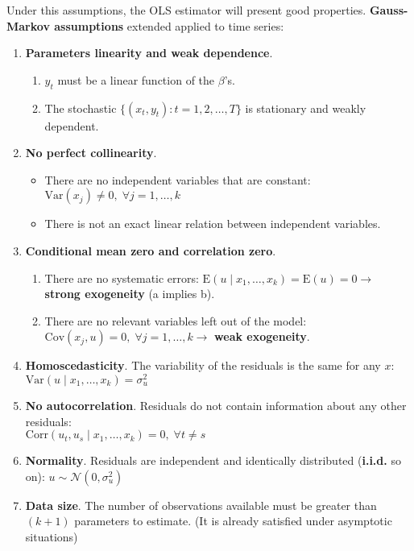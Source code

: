 \documentclass[10pt, a4paper, landscape]{article}
\newcommand{\E}{\mathrm{E}}
\newcommand{\Var}{\mathrm{Var}}
\newcommand{\Cov}{\mathrm{Cov}}
\newcommand{\Corr}{\mathrm{Corr}}
\begin{document}
\begin{multicols}{3}
		Under this assumptions, the OLS estimator will present good properties. \textbf{Gauss-Markov assumptions} extended applied to time series:
		
		\begin{enumerate}[leftmargin=*, label=t\arabic{*}.]
			\item \textbf{Parameters linearity and weak dependence}.
			
			\begin{enumerate}[leftmargin=*, label=\alph{*}.]
				\item $y_{t}$ must be a linear function of the $\beta$'s.
				\item The stochastic $\lbrace( x_{t}, y_{t}) : t = 1, 2, \ldots, T \rbrace$ is stationary and weakly dependent.
			\end{enumerate}
			
			\item \textbf{No perfect collinearity}.
			
			\begin{itemize}[leftmargin=*]
				\item There are no independent variables that are constant: $\Var(x_{j}) \neq 0, \; \forall j = 1, \ldots, k$
				\item There is not an exact linear relation between independent variables.
			\end{itemize}
			
			\item \textbf{Conditional mean zero and correlation zero}.
			
			\begin{enumerate}[leftmargin=*, label=\alph{*}.]
				\item There are no systematic errors: $\E(u \mid x_{1}, \ldots, x_{k}) = \E(u) = 0 \rightarrow$ \textbf{strong exogeneity} (a implies b).
				\item There are no relevant variables left out of the model: $\Cov(x_{j} , u) = 0, \; \forall j = 1, \ldots, k \rightarrow$ \textbf{weak exogeneity}.
			\end{enumerate}
			
			\item \textbf{Homoscedasticity}. The variability of the residuals is the same for any $x$: $\Var(u \mid x_{1}, \ldots, x_{k}) = \sigma^{2}_{u}$
			\item \textbf{No autocorrelation}. Residuals do not contain information about any other residuals: \\
			$\Corr(u_{t}, u_{s} \mid x_{1}, \ldots, x_{k}) = 0, \; \forall t \neq s$
			\item \textbf{Normality}. Residuals are independent and identically distributed (\textbf{i.i.d.} so on): $u \sim \mathcal{N}(0, \sigma^{2}_{u})$
			\item \textbf{Data size}. The number of observations available must be greater than $(k + 1)$ parameters to estimate. (It is already satisfied under asymptotic situations)
		\end{enumerate}
		

\end{multicols}
\end{document}
